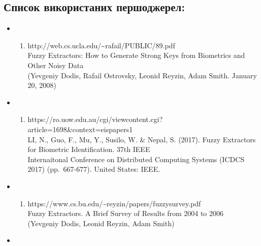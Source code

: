 \documentclass[11pt]{article}
\providecommand{\tightlist}{%
      \setlength{\itemsep}{0pt}\setlength{\parskip}{0pt}}
\begin{document}
    \hypertarget{ux441ux43fux438ux441ux43eux43a-ux432ux438ux43aux43eux440ux438ux441ux442ux430ux43dux438ux445-ux43fux435ux440ux448ux43eux434ux436ux435ux440ux435ux43b}{%
\subsection{Список використаних
першоджерел:}\label{ux441ux43fux438ux441ux43eux43a-ux432ux438ux43aux43eux440ux438ux441ux442ux430ux43dux438ux445-ux43fux435ux440ux448ux43eux434ux436ux435ux440ux435ux43b}}

\begin{itemize}
\item
  \begin{enumerate}
  \def\labelenumi{(\arabic{enumi})}
  \tightlist
  \item
    http://web.cs.ucla.edu/\textasciitilde rafail/PUBLIC/89.pdf\\
    Fuzzy Extractors: How to Generate Strong Keys from Biometrics and
    Other Noisy Data\\
    (Yevgeniy Dodis, Rafail Ostrovsky, Leonid Reyzin, Adam Smith.
    January 20, 2008)
  \end{enumerate}
\item
  \begin{enumerate}
  \def\labelenumi{(\arabic{enumi})}
  \setcounter{enumi}{1}
  \tightlist
  \item
    https://ro.uow.edu.au/cgi/viewcontent.cgi?article=1698\&context=eispapers1\\
    LI, N., Guo, F., Mu, Y., Susilo, W. \& Nepal, S. (2017). Fuzzy
    Extractors for Biometric Identification. 37th IEEE\\
    Internaitonal Conference on Distributed Computing Systems (ICDCS
    2017) (pp.~667-677). United States: IEEE.
  \end{enumerate}
\item
  \begin{enumerate}
  \def\labelenumi{(\arabic{enumi})}
  \setcounter{enumi}{2}
  \tightlist
  \item
    https://www.cs.bu.edu/\textasciitilde reyzin/papers/fuzzysurvey.pdf\\
    Fuzzy Extractors. A Brief Survey of Results from 2004 to 2006\\
    (Yevgeniy Dodis, Leonid Reyzin, Adam Smith)
  \end{enumerate}
\item
  \begin{enumerate}
  \def\labelenumi{(\arabic{enumi})}
  \setcounter{enumi}{3}

\end{enumerate}
\end{itemize}
\end{document}
